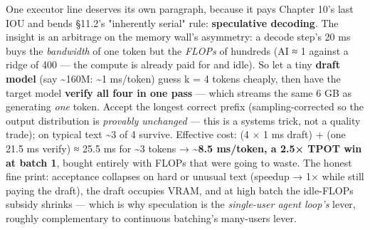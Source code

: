 One executor line deserves its own paragraph, because it pays Chapter 10's last IOU and bends §11.2's "inherently serial" rule: \textbf{speculative decoding}. The insight is an arbitrage on the memory wall's asymmetry: a decode step's 20 ms buys the \textit{bandwidth} of one token but the \textit{FLOPs} of hundreds (AI ≈ 1 against a ridge of 400 — the compute is already paid for and idle). So let a tiny \textbf{draft model} (say \textasciitilde{}160M: \textasciitilde{}1 ms/token) guess k = 4 tokens cheaply, then have the target model \textbf{verify all four in one pass} — which streams the same 6 GB as generating \textit{one} token. Accept the longest correct prefix (sampling-corrected so the output distribution is \textit{provably unchanged} — this is a systems trick, not a quality trade); on typical text \textasciitilde{}3 of 4 survive. Effective cost: (4 × 1 ms draft) + (one 21.5 ms verify) ≈ 25.5 ms for \textasciitilde{}3 tokens → \textbf{\textasciitilde{}8.5 ms/token, a 2.5× TPOT win at batch 1}, bought entirely with FLOPs that were going to waste. The honest fine print: acceptance collapses on hard or unusual text (speedup → 1× while still paying the draft), the draft occupies VRAM, and at high batch the idle-FLOPs subsidy shrinks — which is why speculation is the \textit{single-user agent loop's} lever, roughly complementary to continuous batching's many-users lever.


